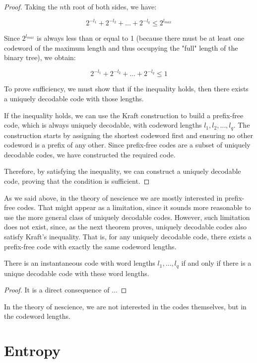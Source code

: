 \begin{proof}
Taking the \( n \)th root of both sides, we have:

\[
2^{-l_1} + 2^{-l_2} + \ldots + 2^{-l_q} \leq 2^{l_{max}}
\]

Since \( 2^{l_{max}} \) is always less than or equal to 1 (because there must be at least one codeword of the maximum length and thus occupying the "full" length of the binary tree), we obtain:

\[
2^{-l_1} + 2^{-l_2} + \ldots + 2^{-l_q} \leq 1
\]

To prove sufficiency, we must show that if the inequality holds, then there exists a uniquely decodable code with those lengths.

If the inequality holds, we can use the Kraft construction to build a prefix-free code, which is always uniquely decodable, with codeword lengths \( l_1, l_2, \ldots, l_q \). The construction starts by assigning the shortest codeword first and ensuring no other codeword is a prefix of any other. Since prefix-free codes are a subset of uniquely decodable codes, we have constructed the required code.

Therefore, by satisfying the inequality, we can construct a uniquely decodable code, proving that the condition is sufficient.

\end{proof}

As we said above, in the theory of nescience we are mostly interested in prefix-free codes. That might appear as a limitation, since it sounds more reasonable to use the more general class of uniquely decodable codes. However, such limitation does not exist, since, as the next theorem proves, uniquely decodable codes also satisfy Kraft's inequality. That is, for any uniquely decodable code, there exists a prefix-free code with exactly the same codeword lengths.

\begin{corollary}
There is an instantaneous code with word lengths $l_1, \ldots, l_q$ if and only if there is a unique decodable code with these word lengths.
\end{corollary}
\begin{proof}
It is a direct consequence of ...
\end{proof}

In the theory of nescience, we are not interested in the codes themselves, but in the codeword lengths.

%
%

\section{Entropy}
\label{sec:Entropy}

